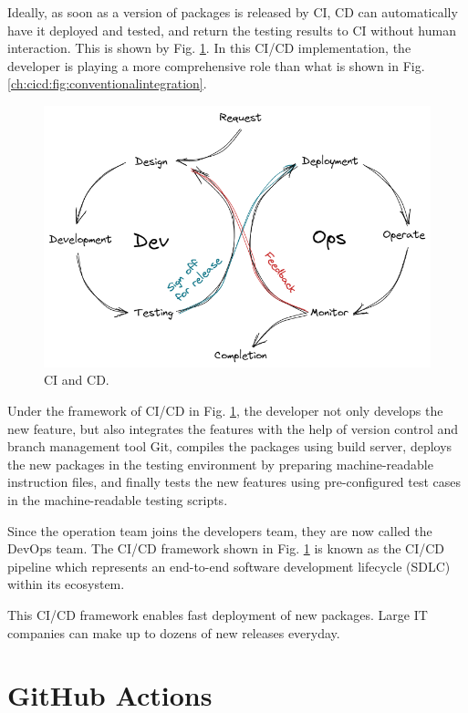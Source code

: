 Ideally, as soon as a version of packages is released by CI, CD can automatically have it deployed and tested, and return the testing results to CI without human interaction. This is shown by Fig. \ref{ch:cicd:fig:cd}. In this CI/CD implementation, the developer is playing a more comprehensive role than what is shown in Fig. \ref{ch:cicd:fig:conventionalintegration}.
\begin{figure}[htbp]
	\centering
	\includegraphics[width=350pt]{chapters/ap/figures/cd.png}
	\caption{CI and CD.} \label{ch:cicd:fig:cd}
\end{figure}

Under the framework of CI/CD in Fig. \ref{ch:cicd:fig:cd}, the developer not only develops the new feature, but also integrates the features with the help of version control and branch management tool Git, compiles the packages using build server, deploys the new packages in the testing environment by preparing machine-readable instruction files, and finally tests the new features using pre-configured test cases in the machine-readable testing scripts.

Since the operation team joins the developers team, they are now called the DevOps team. The CI/CD framework shown in Fig. \ref{ch:cicd:fig:cd} is known as the CI/CD pipeline which represents an end-to-end software development lifecycle (SDLC) within its ecosystem.

This CI/CD framework enables fast deployment of new packages. Large IT companies can make up to dozens of new releases everyday.

\section{GitHub Actions}

